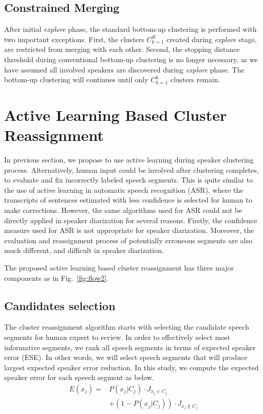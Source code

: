 \documentclass[journal,10pt]{IEEEtran}
\begin{document}
\subsection{Constrained Merging}
After initial \textit{explore} phase, the standard bottom-up clustering is performed with two important exceptions. First, the clusters $C_{k=1}^{K}$ created during \textit{explore} stage, are restricted from merging with each other. Second, the stopping distance threshold during conventional bottom-up clustering is no longer necessary, as we have assumed all involved speakers are discovered during \textit{explore} phase. The bottom-up clustering will continues until only $C_{k=1}^{k}$ clusters remain.

\section{Active Learning Based Cluster Reassignment}
\label{alcr}
In previous section, we propose to use active learning during speaker clustering process. Alternatively, human input could be involved after clustering completes, to evaluate and fix incorrectly labeled speech segments. This is quite similar to the use of active learning in automatic speech recognition (ASR), where the transcripts of sentences estimated with less confidence is selected for human to make corrections. However, the same algorithms used for ASR could not be directly applied in speaker diarization for several reasons. Firstly, the confidence measure used for ASR is not appropriate for speaker diarization. Moreover, the evaluation and reassignment process of potentially erroneous segments are also much different, and difficult in speaker diarization.

The proposed active learning based cluster reassignment has three major components as in Fig.~\ref{fig:flow2}. 

\subsection{Candidates selection}
The cluster reassignment algorithm starts with selecting the candidate speech segments for human expert to review. In order to effectively select most informative segments, we rank all speech segments in terms of expected speaker error (ESE). In other words, we will select speech segments that will produce largest expected speaker error reduction. 
In this study, we compute the expected speaker error for each speech segment as below. 
\begin{equation}
\begin{aligned}
E(x_j) =& P(x_j | C_j) \cdot J_{x_j \in C_j} \\
&+ (1 - P(x_j | C_j)) \cdot J_{x_j \notin C_j}
\label{expect}
\end{aligned}
\end{equation}
\end{document}
